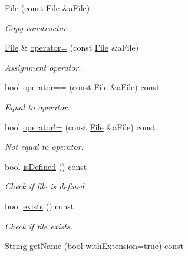 \begin{DoxyCompactItemize}
\item 
\hyperlink{classlibrary_1_1core_1_1fs_1_1_file_a6f3f0d79545ac9984c6f49432f0c6c39}{File} (const \hyperlink{classlibrary_1_1core_1_1fs_1_1_file}{File} \&a\+File)
\begin{DoxyCompactList}\small\item\em Copy constructor. \end{DoxyCompactList}\item 
\hyperlink{classlibrary_1_1core_1_1fs_1_1_file}{File} \& \hyperlink{classlibrary_1_1core_1_1fs_1_1_file_a8143d55e67cf2d6256c7653619a03909}{operator=} (const \hyperlink{classlibrary_1_1core_1_1fs_1_1_file}{File} \&a\+File)
\begin{DoxyCompactList}\small\item\em Assignment operator. \end{DoxyCompactList}\item 
bool \hyperlink{classlibrary_1_1core_1_1fs_1_1_file_a44ab79a23c5a129be298a026dbeec62f}{operator==} (const \hyperlink{classlibrary_1_1core_1_1fs_1_1_file}{File} \&a\+File) const
\begin{DoxyCompactList}\small\item\em Equal to operator. \end{DoxyCompactList}\item 
bool \hyperlink{classlibrary_1_1core_1_1fs_1_1_file_a0354b6dd59250c07cd5a8b679dc36d95}{operator!=} (const \hyperlink{classlibrary_1_1core_1_1fs_1_1_file}{File} \&a\+File) const
\begin{DoxyCompactList}\small\item\em Not equal to operator. \end{DoxyCompactList}\item 
bool \hyperlink{classlibrary_1_1core_1_1fs_1_1_file_a2044eecd956aaf55b4c55872485e1bf9}{is\+Defined} () const
\begin{DoxyCompactList}\small\item\em Check if file is defined. \end{DoxyCompactList}\item 
bool \hyperlink{classlibrary_1_1core_1_1fs_1_1_file_a61851886b6bf66cd0f179b6c7bd7f972}{exists} () const
\begin{DoxyCompactList}\small\item\em Check if file exists. \end{DoxyCompactList}\item 
\hyperlink{classlibrary_1_1core_1_1types_1_1_string}{String} \hyperlink{classlibrary_1_1core_1_1fs_1_1_file_ac8ecef1fd249eaf2ab6d7141131c0424}{get\+Name} (bool with\+Extension=true) const

\end{DoxyCompactItemize}
